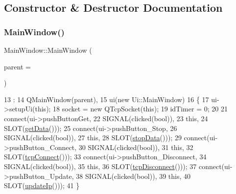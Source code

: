 \subsection{Constructor \& Destructor Documentation}
\mbox{\label{class_main_window_a8b244be8b7b7db1b08de2a2acb9409db}} 
\subsubsection{\texorpdfstring{Main\+Window()}{MainWindow()}}
{\footnotesize\ttfamily Main\+Window\+::\+Main\+Window (\begin{DoxyParamCaption}\item[{Q\+Widget $\ast$}]{parent = {} }\end{DoxyParamCaption})\hspace{0.3cm}{\ttfamily [explicit]}}


\begin{DoxyCode}
13                                       :
14     QMainWindow(parent),
15     ui(\textcolor{keyword}{new} Ui::MainWindow)
16 \{
17     ui->setupUi(\textcolor{keyword}{this});
18     socket = \textcolor{keyword}{new} QTcpSocket(\textcolor{keyword}{this});
19     idTimer = 0;
20 
21     connect(ui->pushButtonGet,
22             SIGNAL(clicked(\textcolor{keywordtype}{bool})),
23             \textcolor{keyword}{this},
24             SLOT(\mbox{\hyperlink{class_main_window_ac6d3a5fa8ef8ede69436b9e9a6ee80c1}{getData}}()));
25     connect(ui->pushButton\_Stop,
26             SIGNAL(clicked(\textcolor{keywordtype}{bool})),
27             \textcolor{keyword}{this},
28             SLOT(\mbox{\hyperlink{class_main_window_a2e3dceeb08f18cc1d07e42b79fe7a0c1}{stopData}}()));
29     connect(ui->pushButton\_Connect,
30             SIGNAL(clicked(\textcolor{keywordtype}{bool})),
31             \textcolor{keyword}{this},
32             SLOT(\mbox{\hyperlink{class_main_window_a26b6030035e196b64333906db8302cdd}{tcpConnect}}()));
33     connect(ui->pushButton\_Disconnect,
34             SIGNAL(clicked(\textcolor{keywordtype}{bool})),
35             \textcolor{keyword}{this},
36             SLOT(\mbox{\hyperlink{class_main_window_a3389bbbe4222f115a7609037a1a63bd5}{tcpDisconnect}}()));
37     connect(ui->pushButton\_Update,
38             SIGNAL(clicked(\textcolor{keywordtype}{bool})),
39             \textcolor{keyword}{this},
40             SLOT(\mbox{\hyperlink{class_main_window_a6d5ab019a97676b4edfe7d4b6a541455}{updateIp}}()));
41 \}
\end{DoxyCode}
\mbox{\label{class_main_window_ae98d00a93bc118200eeef9f9bba1dba7}} 
